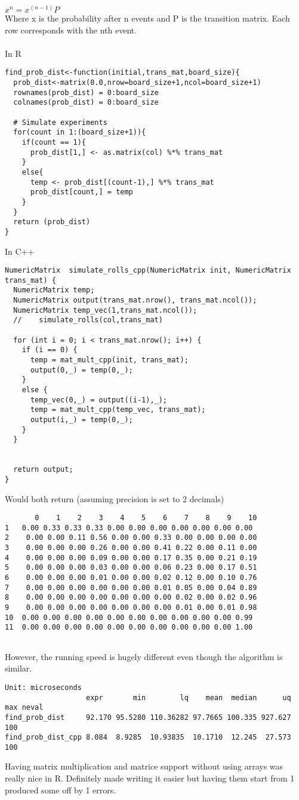 \documentclass[11pt]{article}
\begin{document}
\begin{math}
x^n = x^{(n-1)}P
\end{math}
\\
Where x is the probability after n events and P is the transition matrix.
Each row corresponds with the nth event. 
\\\\
In R
\begin{verbatim}
find_prob_dist<-function(initial,trans_mat,board_size){
  prob_dist<-matrix(0.0,nrow=board_size+1,ncol=board_size+1)
  rownames(prob_dist) = 0:board_size
  colnames(prob_dist) = 0:board_size

  # Simulate experiments
  for(count in 1:(board_size+1)){
    if(count == 1){
      prob_dist[1,] <- as.matrix(col) %*% trans_mat
    }
    else{
      temp <- prob_dist[(count-1),] %*% trans_mat
      prob_dist[count,] = temp
    }
  }
  return (prob_dist)
}
\end{verbatim}
In C++
\begin{verbatim}
NumericMatrix  simulate_rolls_cpp(NumericMatrix init, NumericMatrix trans_mat) {
  NumericMatrix temp;
  NumericMatrix output(trans_mat.nrow(), trans_mat.ncol());
  NumericMatrix temp_vec(1,trans_mat.ncol());
  //    simulate_rolls(col,trans_mat)
  
  for (int i = 0; i < trans_mat.nrow(); i++) {
    if (i == 0) {
      temp = mat_mult_cpp(init, trans_mat);
      output(0,_) = temp(0,_);
    } 
    else {
      temp_vec(0,_) = output((i-1),_);
      temp = mat_mult_cpp(temp_vec, trans_mat);
      output(i,_) = temp(0,_);
    }
  }
  
  
  return output;
}
\end{verbatim}
Would both return (assuming precision is set to 2 decimals)
\begin{verbatim}
	   0    1    2    3    4    5    6    7    8    9    10 
1 	0.00 0.33 0.33 0.33 0.00 0.00 0.00 0.00 0.00 0.00 0.00 
2	 0.00 0.00 0.11 0.56 0.00 0.00 0.33 0.00 0.00 0.00 0.00 
3	 0.00 0.00 0.00 0.26 0.00 0.00 0.41 0.22 0.00 0.11 0.00 
4	 0.00 0.00 0.00 0.09 0.00 0.00 0.17 0.35 0.00 0.21 0.19 
5	 0.00 0.00 0.00 0.03 0.00 0.00 0.06 0.23 0.00 0.17 0.51 
6	 0.00 0.00 0.00 0.01 0.00 0.00 0.02 0.12 0.00 0.10 0.76 
7	 0.00 0.00 0.00 0.00 0.00 0.00 0.01 0.05 0.00 0.04 0.89 
8	 0.00 0.00 0.00 0.00 0.00 0.00 0.00 0.02 0.00 0.02 0.96 
9	 0.00 0.00 0.00 0.00 0.00 0.00 0.00 0.01 0.00 0.01 0.98 
10	0.00 0.00 0.00 0.00 0.00 0.00 0.00 0.00 0.00 0.00 0.99 
11	0.00 0.00 0.00 0.00 0.00 0.00 0.00 0.00 0.00 0.00 1.00 


\end{verbatim}


However, the running speed is hugely different even though the algorithm is similar.
\begin{verbatim}
Unit: microseconds
                   expr       min        lq    mean  median      uq  max neval
find_prob_dist     92.170 95.5280 110.36282 97.7665 100.335 927.627        100
find_prob_dist_cpp 8.084  8.9285  10.93835  10.1710  12.245  27.573        100
\end{verbatim}

Having matrix multiplication and matrice support without using arrays was really nice in R. Definitely made writing it easier but having them start from 1 produced some off by 1 errors. 
\end{document}
